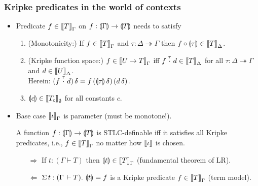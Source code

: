 \documentclass[t,fleqn,usenames,dvipsnames]{beamer}
\newcommand{\ope}{\twoheadrightarrow}
\begin{document}
\begin{frame}%
  \frametitle{Kripke predicates in the world of contexts}
  \vspace{-3ex}
  \begin{itemize}
  \item Predicate $f \in \Den T \Gamma$ on
    $f : \denty\Gamma \to \denty T$ needs to satisfy
    \begin{enumerate}
    \item (Monotonicity:)  If $f \in \Den T \Gamma$ and $\tau : \Delta
      \ope \Gamma$ then $f \comp \denty\tau \in \Den T \Delta$.
    \item (Kripke function space:)  $f \in \Den{U \to T}\Gamma$ iff $f
      \stackrel\tau\cdot d \in \Den T \Delta$ for all $\tau :
      \Delta \ope \Gamma$ and $d \in \Den U \Delta$.\\
      Herein: $(f \stackrel\tau\cdot d)\,\delta =
      f\,(\denty\tau\,\delta)\,(d\,\delta)$.
    \item $\denty c \in \Den {T_c} \cempty$ for all constants $c$.
    \end{enumerate}
  \item Base case $\Den \iota \Gamma$ is parameter (must be
    monotone!).
    \begin{theorem}
      A function $f : \denty\Gamma \to \denty T$ is STLC-definable iff
      it satisfies all Kripke predicates, i.e., $f \in \Den T \Gamma$
      no matter how $\den \iota$ is chosen.
    \end{theorem}
    \begin{enumerate}
    \item[$\Rightarrow$] If $t : (\Gamma \vdash T)$ then $\denty t \in
      \Den T \Gamma$ (fundamental theorem of LR).
    \item[$\Leftarrow$] $\Sigma\, t : (\Gamma \der T).\ \denty t = f$
      is a Kripke predicate $f \in \Den T \Gamma$
      (term model).
    \end{enumerate}
  \end{itemize}
\end{frame}
\end{document}
